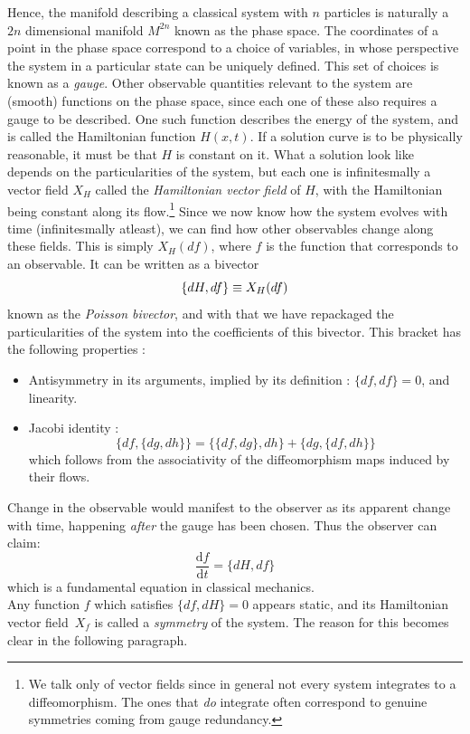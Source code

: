 \documentclass[
  12pt,
  a4paper, oneside
]{report}
\theoremstyle{bolddef}
\theoremstyle{remark}
\numberwithin{equation}{chapter}
\begin{document}
\bigskip 
Hence, the manifold describing a classical system with $n$ particles is naturally a $2n$ dimensional manifold $M^{2n}$
known as the phase space.
The coordinates of a point in the phase space correspond to a choice of variables, in whose perspective the system in a particular 
state can be uniquely defined. This 
set of choices is known as a \textit{gauge}. Other
observable quantities relevant to the system are (smooth) functions on the phase space, since each one of these also requires
a gauge to be described. One such function describes the energy of the system, and is called the Hamiltonian function $H(x,t)$.
If a solution curve is to be physically reasonable, it must be that $H$ is constant on it. What a solution look like
depends on the particularities of the system, but each one is infinitesmally a vector field $X_{H}$ called the
\textit{Hamiltonian vector field} of $H$, with the Hamiltonian being constant along its flow.\footnote{We talk only of 
vector fields since in general not every system integrates to a diffeomorphism. The ones that \textit{do} integrate 
often correspond to genuine symmetries coming from gauge redundancy.} Since we now know how the system evolves with time
(infinitesmally atleast), we can find how other observables change along these fields. This is simply $X_{H}(df)$, where $f$ is 
the function that corresponds to an observable. It can be written as a bivector  $$
\{ dH,df \} \equiv X_{H}(df)
\vspace{0.6cm}$$ 
known as the \textit{Poisson bivector}, and with that we have repackaged the particularities of the system into the coefficients of this bivector.
This bracket has the following properties :
\begin{itemize}
\item  Antisymmetry in its arguments, implied by its definition : $\{ df,df \}=0$, and linearity. 
\item Jacobi identity : $$
\{ df, \{ dg,dh \} \} = \{ \{ df,dg \},dh \} + \{ dg,\{ df,dh \} \}
$$
which follows from the associativity of the diffeomorphism maps induced by their flows.
\end{itemize}

\bigskip


Change in the observable would manifest to the observer as its apparent change with time,
happening \textit{after} the gauge has been chosen. Thus the observer can claim: 
$$
\frac{\mathrm{d}f}{\mathrm{d}t} = \{ dH,df \}  
$$
which is a fundamental equation in classical mechanics.\\
Any function $f$ which satisfies $\{ df,dH \}=0$ appears static, and its Hamiltonian vector field\ $X_{f}$ is called 
a \textit{symmetry} of the system. The reason for this becomes clear in the following paragraph. 
\end{document}
